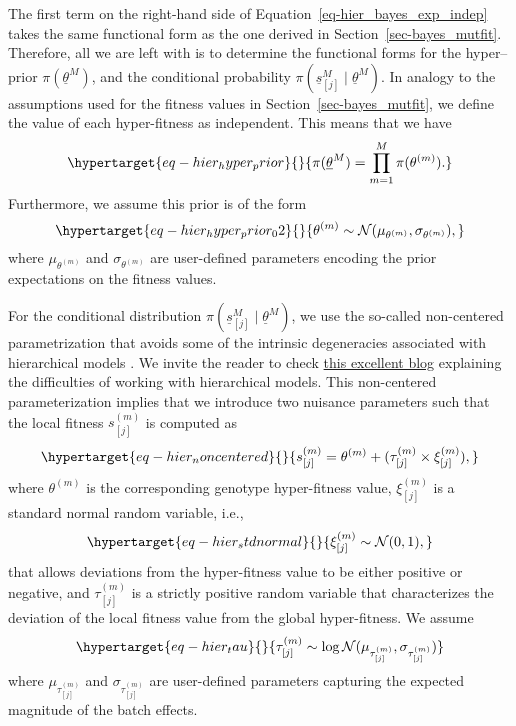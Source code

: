 \documentclass[
  letterpaper,
  DIV=11,
  numbers=noendperiod]{scrartcl}
\begin{document}
\begin{refsegment}
The first term on the right-hand side of
Equation~\ref{eq-hier_bayes_exp_indep} takes the same functional form as
the one derived in Section~\ref{sec-bayes_mutfit}. Therefore, all we are
left with is to determine the functional forms for the hyper--prior
\(\pi(\underline{\theta}^M)\), and the conditional probability
\(\pi(\underline{s}^M_{[j]} \mid \underline{\theta}^M)\). In analogy to
the assumptions used for the fitness values in
Section~\ref{sec-bayes_mutfit}, we define the value of each
hyper-fitness as independent. This means that we have
\begin{equation}\protect\hypertarget{eq-hier_hyper_prior}{}{
\pi(\underline{\theta}^M) = \prod_{m=1}^M \pi(\theta^{(m)}).
}\label{eq-hier_hyper_prior}\end{equation} Furthermore, we assume this
prior is of the form
\begin{equation}\protect\hypertarget{eq-hier_hyper_prior_02}{}{
\theta^{(m)} \sim \mathcal{N}(\mu_{\theta^{(m)}}, \sigma_{\theta^{(m)}}),
}\label{eq-hier_hyper_prior_02}\end{equation} where
\(\mu_{\theta^{(m)}}\) and \(\sigma_{\theta^{(m)}}\) are user-defined
parameters encoding the prior expectations on the fitness values.

For the conditional distribution
\(\pi(\underline{s}^M_{[j]} \mid \underline{\theta}^M)\), we use the
so-called non-centered parametrization that avoids some of the intrinsic
degeneracies associated with hierarchical models
\autocite{betancourt2013}. We invite the reader to check
\href{https://betanalpha.github.io/assets/case_studies/hierarchical_modeling.html}{this
excellent blog} explaining the difficulties of working with hierarchical
models. This non-centered parameterization implies that we introduce two
nuisance parameters such that the local fitness \(s_{[j]}^{(m)}\) is
computed as \begin{equation}\protect\hypertarget{eq-hier_noncentered}{}{
s_{[j]}^{(m)} = \theta^{(m)} + 
(\tau_{[j]}^{(m)} \times \xi_{[j]}^{(m)}),
}\label{eq-hier_noncentered}\end{equation} where \(\theta^{(m)}\) is the
corresponding genotype hyper-fitness value, \(\xi_{[j]}^{(m)}\) is a
standard normal random variable, i.e.,
\begin{equation}\protect\hypertarget{eq-hier_stdnormal}{}{
\xi_{[j]}^{(m)} \sim \mathcal{N}(0, 1),
}\label{eq-hier_stdnormal}\end{equation} that allows deviations from the
hyper-fitness value to be either positive or negative, and
\(\tau_{[j]}^{(m)}\) is a strictly positive random variable that
characterizes the deviation of the local fitness value from the global
hyper-fitness. We assume
\begin{equation}\protect\hypertarget{eq-hier_tau}{}{
\tau_{[j]}^{(m)} \sim \log\mathcal{N}(
    \mu_{\tau_{[j]}^{(m)}}, \sigma_{\tau_{[j]}^{(m)}}
)
}\label{eq-hier_tau}\end{equation} where \(\mu_{\tau_{[j]}^{(m)}}\) and
\(\sigma_{\tau_{[j]}^{(m)}}\) are user-defined parameters capturing the
expected magnitude of the batch effects.


\end{refsegment}
\end{document}
